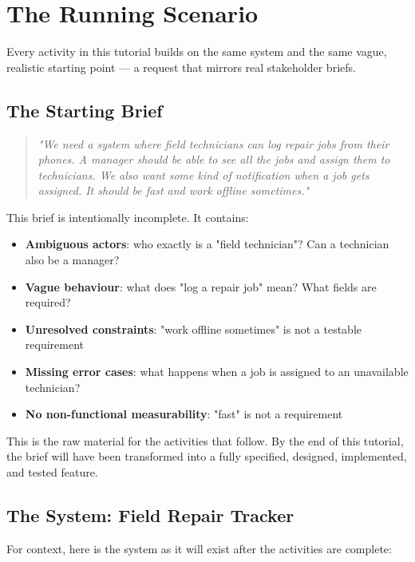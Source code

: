 \documentclass[11pt,a4paper]{book}
\begin{document}
\medskip

\section{The Running Scenario}

Every activity in this tutorial builds on the same system and the same vague, realistic starting point --- a request that mirrors real stakeholder briefs.

\subsection{The Starting Brief}

\begin{quote}
\textit{\textit{"We need a system where field technicians can log repair jobs from their phones. A manager should be able to see all the jobs and assign them to technicians. We also want some kind of notification when a job gets assigned. It should be fast and work offline sometimes."}}
\end{quote}

This brief is intentionally incomplete. It contains:

\begin{itemize}
  \item \textbf{Ambiguous actors}: who exactly is a "field technician"? Can a technician also be a manager?
  \item \textbf{Vague behaviour}: what does "log a repair job" mean? What fields are required?
  \item \textbf{Unresolved constraints}: "work offline sometimes" is not a testable requirement
  \item \textbf{Missing error cases}: what happens when a job is assigned to an unavailable technician?
  \item \textbf{No non-functional measurability}: "fast" is not a requirement
\end{itemize}

This is the raw material for the activities that follow. By the end of this tutorial, the brief will have been transformed into a fully specified, designed, implemented, and tested feature.

\subsection{The System: Field Repair Tracker}

For context, here is the system as it will exist after the activities are complete:
\end{document}
